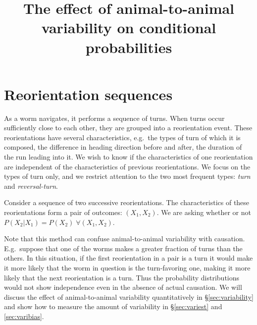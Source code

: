 \documentclass[12pt]{article}
\title{The effect of animal-to-animal variability on conditional probabilities}
\newcommand{\sref}[1]{\S\ref{#1}}
\newcommand{\eg}{e.g.\ }
\newcommand{\Eg}{E.g.\ }
\begin{document}
\maketitle







\section{Reorientation sequences}\label{sec:reoseq}

As a worm navigates, it performs a sequence of turns. When turns occur sufficiently close to each other, they are grouped into a reorientation event. These reorientations have several characteristics, \eg the types of turn of which it is composed, the difference in heading direction before and after, the duration of the run leading into it. We wish to know if the characteristics of one reorientation are independent of the characteristics of previous reorientations. We focus on the types of turn only, and we restrict attention to the two most frequent types: \emph{turn} and \emph{reversal-turn}.

Consider a sequence of two successive reorientations. The characteristics of these reorientations form a pair of outcomes: $(X_1,X_2)$. We are asking whether or not $P(X_2|X_1) = P(X_2) \; \forall (X_1,X_2)$.

%

Note that this method can confuse animal-to-animal variability with causation. \Eg suppose that one of the worms makes a greater fraction of turns than the others. In this situation, if the first reorientation in a pair is a turn it would make it more likely that the worm in question is the turn-favoring one, making it more likely that the next reorientation is a turn. Thus the probability distributions would not show independence even in the absence of actual causation. We will discuss the effect of animal-to-animal variability quantitatively in \sref{sec:variability} and show how to measure the amount of variability in \sref{sec:variest} and \ref{sec:varibias}.
\end{document}
